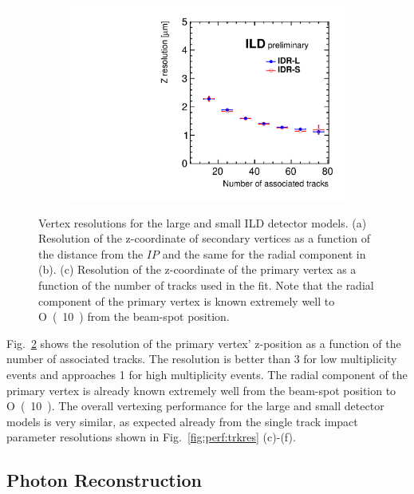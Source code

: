 \begin{figure}[htbp]
\begin{subfigure}{0.49\hsize}
 \caption{  \label{fig:perf:svtx_z}}
 \end{subfigure}
\begin{subfigure}{0.49\hsize}
 \includegraphics[width=\hsize]{Performance/fig/pvtx_z_resol.pdf}
 \caption{  \label{fig:perf:pvtx_z}}
 \end{subfigure}
\caption{ Vertex resolutions for the large and small ILD detector models.
  (a) Resolution of the z-coordinate of secondary vertices as a function of the distance from the $IP$ and the same for the radial component in (b).
  (c) Resolution of the z-coordinate of the primary vertex as a function of the number of tracks used in the fit. 
  Note that the radial component of the primary vertex is known extremely well to \unit{O(10)}{\nm} from the beam-spot position.
}
\label{fig:perf:vtxres}
\end{figure}
%
Fig.~\ref{fig:perf:pvtx_z} shows the resolution of the primary vertex' z-position as a function of the number of associated tracks.
The resolution is better than \unit{3}{\micron} for low multiplicity events and
approaches \unit{1}{\micron} for high multiplicity events.  The radial component of the primary vertex is already known
extremely well from the beam-spot position to \unit{O(10)}{\nm}. The overall vertexing performance for the large and small detector models
is very similar, as expected already from the single track impact parameter resolutions shown in Fig.~\ref{fig:perf:trkres} (c)-(f).



\subsection{Photon Reconstruction}
